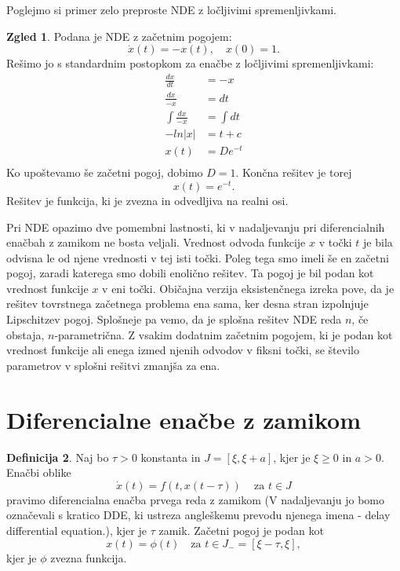 \documentclass[12pt,a4paper]{amsart}
\theoremstyle{definition} %
\newtheorem{definicija}{Definicija}[section]
\newtheorem{zgled}[definicija]{Zgled}
\theoremstyle{plain} %
\begin{document}
Poglejmo si primer zelo preproste NDE z ločljivimi spremenljivkami.

\begin{zgled}
    Podana je NDE z začetnim pogojem:
    \[\dot{x}(t) =-x(t),\quad x(0)=1.\]
    Rešimo jo s standardnim postopkom za enačbe z ločljivimi spremenljivkami:
    \begin{equation*}
    \begin{split}
      \frac{dx}{dt} & =-x \\
      \frac{dx}{-x} & =dt \\
      \int \frac{dx}{-x} & =\int dt \\
     -ln|x| & =t+c \\
      x(t) & =De^{-t} \\
    \end{split}
    \end{equation*}
Ko upoštevamo še začetni pogoj, dobimo $D=1$. Končna rešitev je torej \[x(t)=e^{-t}.\]
Rešitev je funkcija, ki je zvezna in odvedljiva na realni osi.
\end{zgled}

Pri NDE opazimo dve pomembni lastnosti, ki v nadaljevanju pri diferencialnih enačbah z zamikom ne bosta veljali. 
Vrednost odvoda funkcije $x$ v točki $t$ je bila odvisna le od njene vrednosti v tej isti točki. Poleg tega smo 
imeli še en začetni pogoj, zaradi katerega smo dobili enolično rešitev. Ta pogoj je bil podan kot vrednost funkcije
$x$ v eni točki. Običajna verzija eksistenčnega izreka pove, da je rešitev tovrstnega začetnega problema
ena sama, ker desna stran izpolnjuje Lipschitzev pogoj. Splošneje pa vemo, da
je splošna rešitev NDE reda $n$, če obstaja, $n$-parametrična.
Z vsakim dodatnim začetnim pogojem, ki je podan kot vrednost funkcije ali enega izmed njenih odvodov v fiksni točki,
se število parametrov v splošni rešitvi zmanjša za ena.

\newpage

\section{Diferencialne enačbe z zamikom}

\begin{definicija}
    Naj bo $\tau > 0$ konstanta in $J = [\xi,\xi +a]$, kjer je $\xi \geq 0$ in $a > 0$. Enačbi oblike
    \[\dot{x}(t)=f(t,x(t-\tau))\, \quad \text{za } t \in J\]
    pravimo diferencialna enačba prvega reda z zamikom (V nadaljevanju jo bomo 
    označevali s kratico DDE, ki ustreza angleškemu prevodu njenega imena - 
    delay differential equation.), kjer je $\tau$ zamik.
    Začetni pogoj je podan kot
    \[x(t)=\phi(t) \quad \text{za } t \in J_{-} = [\xi-\tau,\xi],\]kjer je $\phi$ zvezna funkcija.
\end{definicija}
\end{document}
